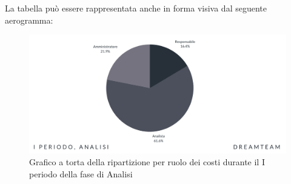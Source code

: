 La tabella può essere rappresentata anche in forma visiva dal seguente aerogramma:
\begin{figure}[H]
\centering
\includegraphics[scale=0.65]{Sezioni/SezioniPreventivo/grafici/Analisi_I_periodo_costi.png}
\caption{Grafico a torta della ripartizione per ruolo dei costi durante il I periodo della fase di Analisi}
\end{figure}




